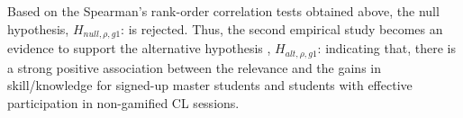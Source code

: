 Based on the Spearman's rank-order correlation tests obtained above, the null hypothesis, $H_{null,\rho,g1}$:  is rejected. Thus, the second empirical study becomes an evidence to support the alternative hypothesis , $H_{alt,\rho,g1}$:  indicating that, there is a strong positive association between the relevance and the gains in skill/knowledge for signed-up master students and students with effective participation in non-gamified CL sessions.

